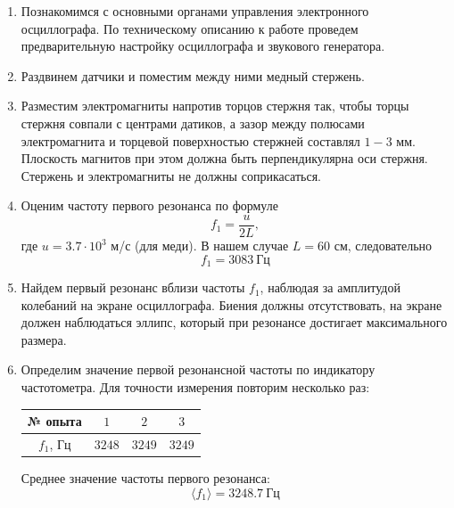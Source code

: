 \documentclass[a4paper,12pt]{article}
\begin{document}
	\begin{enumerate}
		\item Познакомимся с основными органами управления электронного осциллографа. По техническому описанию к работе проведем предварительную настройку осциллографа и звукового генератора.
		\item Раздвинем датчики и поместим между ними медный стержень.
		\item Разместим электромагниты напротив торцов стержня так, чтобы торцы стержня совпали с центрами датиков, а зазор между полюсами электромагнита и торцевой поверхностью стержней составлял $1-3$ мм. Плоскость магнитов при этом должна быть перпендикулярна оси стержня. Стержень и электромагниты не должны соприкасаться.
		\item Оценим частоту первого резонанса по формуле
		$$
		f_1 = \frac{u}{2L},
		$$
		где $u = 3.7\cdot 10^3$ м/с (для меди).
		В нашем случае $L = 60$ см, следовательно
		$$
		f_1 = 3083~\text{Гц}
		$$
		\item Найдем первый резонанс вблизи частоты $f_1$, наблюдая за амплитудой колебаний на экране осциллографа. Биения должны отсутствовать, на экране должен наблюдаться эллипс, который при резонансе достигает максимального размера.
		\item Определим значение первой резонансной частоты по индикатору частотометра. Для точности измерения повторим несколько раз:
		\begin{table}[h]
			\centering
			\begin{tabular}{|c|c|c|c|} \hline
				№ опыта & $1$ & $2$ & $3$ \\ \hline
				$f_1$, Гц & $3248$ & $3249$ & $3249$ \\ \hline
			\end{tabular}
		\end{table}

		Среднее значение частоты первого резонанса:
		$$
		\langle f_1 \rangle = 3248.7~\text{Гц}
		$$


\end{enumerate}
\end{document}
